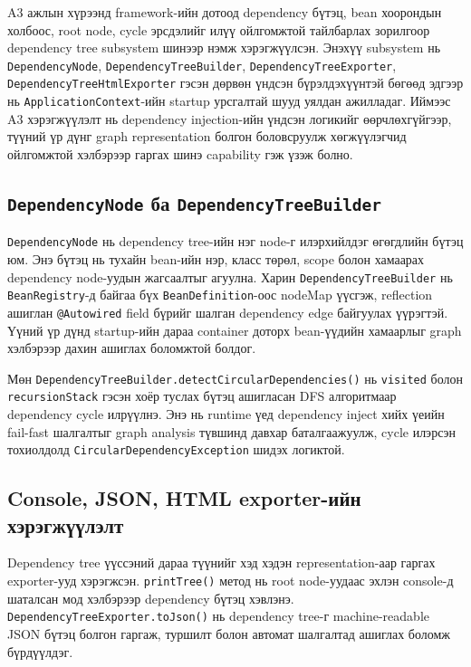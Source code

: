 A3 ажлын хүрээнд framework-ийн дотоод dependency бүтэц, bean хоорондын холбоос, root node, cycle эрсдэлийг илүү ойлгомжтой тайлбарлах зорилгоор dependency tree subsystem шинээр нэмж хэрэгжүүлсэн. Энэхүү subsystem нь \texttt{DependencyNode}, \texttt{DependencyTreeBuilder}, \texttt{DependencyTreeExporter}, \texttt{DependencyTreeHtmlExporter} гэсэн дөрвөн үндсэн бүрэлдэхүүнтэй бөгөөд эдгээр нь \texttt{ApplicationContext}-ийн startup урсгалтай шууд уялдан ажилладаг. Иймээс A3 хэрэгжүүлэлт нь dependency injection-ийн үндсэн логикийг өөрчлөхгүйгээр, түүний үр дүнг graph representation болгон боловсруулж хөгжүүлэгчид ойлгомжтой хэлбэрээр гаргах шинэ capability гэж үзэж болно.

\subsection{\texttt{DependencyNode} ба \texttt{DependencyTreeBuilder}}

\texttt{DependencyNode} нь dependency tree-ийн нэг node-г илэрхийлдэг өгөгдлийн бүтэц юм. Энэ бүтэц нь тухайн bean-ийн нэр, класс төрөл, scope болон хамаарах dependency node-уудын жагсаалтыг агуулна. Харин \texttt{DependencyTreeBuilder} нь \texttt{BeanRegistry}-д байгаа бүх \texttt{BeanDefinition}-оос nodeMap үүсгэж, reflection ашиглан \texttt{@Autowired} field бүрийг шалган dependency edge байгуулах үүрэгтэй. Үүний үр дүнд startup-ийн дараа container доторх bean-үүдийн хамаарлыг graph хэлбэрээр дахин ашиглах боломжтой болдог.

Мөн \texttt{DependencyTreeBuilder.detectCircularDependencies()} нь \texttt{visited} болон \texttt{recursionStack} гэсэн хоёр туслах бүтэц ашигласан DFS алгоритмаар dependency cycle илрүүлнэ. Энэ нь runtime үед dependency inject хийх үеийн fail-fast шалгалтыг graph analysis түвшинд давхар баталгаажуулж, cycle илэрсэн тохиолдолд \texttt{CircularDependencyException} шидэх логиктой.

\subsection{Console, JSON, HTML exporter-ийн хэрэгжүүлэлт}

Dependency tree үүссэний дараа түүнийг хэд хэдэн representation-аар гаргах exporter-ууд хэрэгжсэн. \texttt{printTree()} метод нь root node-уудаас эхлэн console-д шаталсан мод хэлбэрээр dependency бүтэц хэвлэнэ. \texttt{DependencyTreeExporter.toJson()} нь dependency tree-г machine-readable JSON бүтэц болгон гаргаж, туршилт болон автомат шалгалтад ашиглах боломж бүрдүүлдэг.

